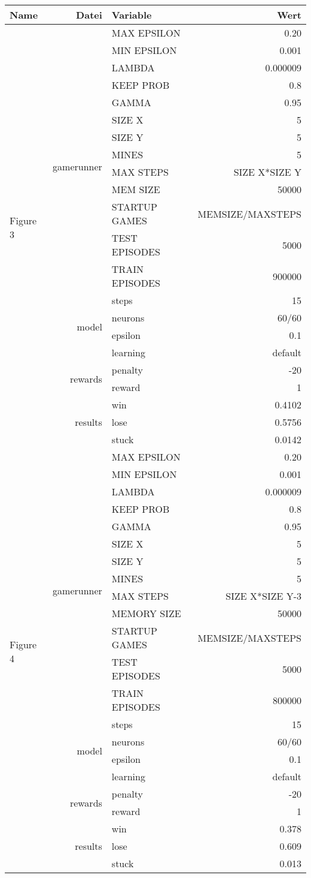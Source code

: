 \documentclass[9pt]{article}
\begin{document}
\begin{tabularx}{\textwidth}{l|r|X|r}
	Name & Datei & Variable & Wert\\
\hline
\multirow{21}{*}{Figure 3} & \multirow{14}{*}{gamerunner} & MAX EPSILON	& 0.20\\
& & MIN EPSILON	& 0.001 \\
& & LAMBDA & 0.000009 \\
& & KEEP PROB & 0.8 \\
& & GAMMA	& 0.95 \\
& & SIZE X & 5 \\
& & SIZE Y & 5 \\
& & MINES & 5 \\
& & MAX STEPS & SIZE X*SIZE Y\\
& & MEM SIZE & 50000 \\
& & STARTUP GAMES & MEMSIZE/MAXSTEPS \\
& & TEST EPISODES & 5000 \\
& & TRAIN EPISODES & 900000 \\
& & steps & 15\\\cline{2-4}
& \multirow{2}{*}{model} & neurons & 60/60 \\ 
& & epsilon & 0.1\\
& & learning & default \\\cline{2-4}
& \multirow{2}{*}{rewards} & penalty	&-20\\
& & reward& 1\\\cline{2-4}
& \multirow{3}{*}{results} & win & 0.4102\\
& & lose & 0.5756\\
& & stuck & 0.0142\\
\hline
\hline
\multirow{21}{*}{Figure 4} & \multirow{14}{*}{gamerunner} & MAX EPSILON	& 0.20\\
& & MIN EPSILON	& 0.001 \\
& & LAMBDA & 0.000009 \\
& & KEEP PROB & 0.8 \\
& & GAMMA	& 0.95 \\
& & SIZE X & 5 \\
& & SIZE Y & 5 \\
& & MINES & 5 \\
& & MAX STEPS & SIZE X*SIZE Y-3\\
& & MEMORY SIZE & 50000 \\
& & STARTUP GAMES & MEMSIZE/MAXSTEPS \\
& & TEST EPISODES & 5000 \\
& & TRAIN EPISODES & 800000 \\
& & steps & 15\\\cline{2-4}
& \multirow{2}{*}{model} & neurons & 60/60 \\ 
& & epsilon & 0.1\\
& & learning & default \\\cline{2-4}
& \multirow{2}{*}{rewards} & penalty	&-20\\
& & reward& 1\\\cline{2-4}
& \multirow{3}{*}{results} & win & 0.378\\
& & lose & 0.609\\
& & stuck & 0.013\\
\hline
\end{tabularx}
\end{document}
